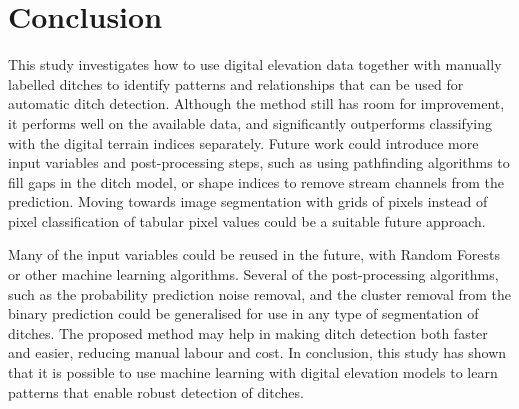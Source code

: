 \documentclass[]{interact}
\theoremstyle{plain}%
\theoremstyle{definition}
\theoremstyle{remark}
\begin{document}
\section{Conclusion}



This study investigates how to use digital elevation data together with manually labelled ditches to identify patterns and relationships that can be used for automatic ditch detection. Although the method still has room for improvement, it performs well on the available data, and significantly outperforms classifying with the digital terrain indices separately. Future work could introduce more input variables and post-processing steps, such as using pathfinding algorithms to fill gaps in the ditch model, or shape indices to remove stream channels from the prediction. Moving towards image segmentation with grids of pixels instead of pixel classification of tabular pixel values could be a suitable future approach.

Many of the input variables could be reused in the future, with Random Forests or other machine learning algorithms. Several of the post-processing algorithms, such as the probability prediction noise removal, and the cluster removal from the binary prediction could be generalised for use in any type of segmentation of ditches. The proposed method may help in making ditch detection both faster and easier, reducing manual labour and cost. In conclusion, this study has shown that it is possible to use machine learning with digital elevation models to learn patterns that enable robust detection of ditches.
\end{document}
